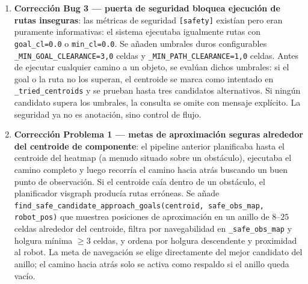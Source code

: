 \documentclass[11pt,a4paper]{article}
\begin{document}
\begin{enumerate}
  \item \textbf{Corrección Bug 3 — puerta de seguridad bloquea ejecución de rutas
        inseguras}: las métricas de seguridad \texttt{[safety]} existían pero eran
        puramente informativas: el sistema ejecutaba igualmente rutas con
        \texttt{goal\_cl=0.0} o \texttt{min\_cl=0.0}. Se añaden umbrales duros
        configurables \texttt{\_MIN\_GOAL\_CLEARANCE=3{,}0} celdas y
        \texttt{\_MIN\_PATH\_CLEARANCE=1{,}0} celdas. Antes de ejecutar cualquier
        camino a un objeto, se evalúan dichos umbrales: si el goal o la ruta no los
        superan, el centroide se marca como intentado en \texttt{\_tried\_centroids}
        y se prueban hasta tres candidatos alternativos. Si ningún candidato
        supera los umbrales, la consulta se omite con mensaje explícito. La
        seguridad ya no es anotación, sino control de flujo.

  \item \textbf{Corrección Problema 1 — metas de aproximación seguras alrededor del
        centroide de componente}: el pipeline anterior planificaba hasta el centroide
        del heatmap (a menudo situado sobre un obstáculo), ejecutaba el camino completo
        y luego recorría el camino hacia atrás buscando un buen punto de observación. Si
        el centroide caía dentro de un obstáculo, el planificador visgraph producía rutas
        erróneas. Se añade \texttt{find\_safe\_candidate\_approach\_goals(centroid,
        safe\_obs\_map, robot\_pos)} que muestrea posiciones de aproximación en un anillo
        de $8$--$25$ celdas alrededor del centroide, filtra por navegabilidad en
        \texttt{\_safe\_obs\_map} y holgura mínima $\ge 3$ celdas, y ordena por holgura
        descendente y proximidad al robot. La meta de navegación se elige directamente
        del mejor candidato del anillo; el camino hacia atrás solo se activa como
        respaldo si el anillo queda vacío.


\end{enumerate}
\end{document}
